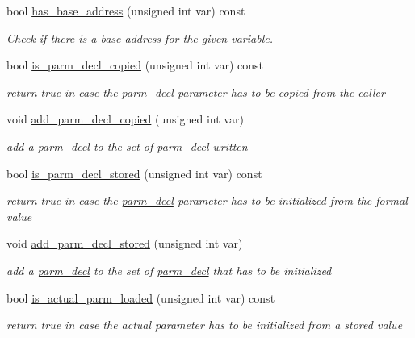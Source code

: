 \begin{DoxyCompactItemize}
bool \hyperlink{classmemory_a96f4c37de951e186df09a2ddc249d77b}{has\+\_\+base\+\_\+address} (unsigned int var) const
\begin{DoxyCompactList}\small\item\em Check if there is a base address for the given variable. \end{DoxyCompactList}\item 
bool \hyperlink{classmemory_ae761b88fcafd4a0c6c7ae4426fe6ceb6}{is\+\_\+parm\+\_\+decl\+\_\+copied} (unsigned int var) const
\begin{DoxyCompactList}\small\item\em return true in case the \hyperlink{structparm__decl}{parm\+\_\+decl} parameter has to be copied from the caller \end{DoxyCompactList}\item 
void \hyperlink{classmemory_aa397acb159d30fa221af9cd66c442d7f}{add\+\_\+parm\+\_\+decl\+\_\+copied} (unsigned int var)
\begin{DoxyCompactList}\small\item\em add a \hyperlink{structparm__decl}{parm\+\_\+decl} to the set of \hyperlink{structparm__decl}{parm\+\_\+decl} written \end{DoxyCompactList}\item 
bool \hyperlink{classmemory_aea74338373012206d2b769a4f1e144c4}{is\+\_\+parm\+\_\+decl\+\_\+stored} (unsigned int var) const
\begin{DoxyCompactList}\small\item\em return true in case the \hyperlink{structparm__decl}{parm\+\_\+decl} parameter has to be initialized from the formal value \end{DoxyCompactList}\item 
void \hyperlink{classmemory_a480a93ec1ca630ee87d15b1ad127f3f2}{add\+\_\+parm\+\_\+decl\+\_\+stored} (unsigned int var)
\begin{DoxyCompactList}\small\item\em add a \hyperlink{structparm__decl}{parm\+\_\+decl} to the set of \hyperlink{structparm__decl}{parm\+\_\+decl} that has to be initialized \end{DoxyCompactList}\item 
bool \hyperlink{classmemory_af12efe6e45e237f9db7bdb650121e3b9}{is\+\_\+actual\+\_\+parm\+\_\+loaded} (unsigned int var) const
\begin{DoxyCompactList}\small\item\em return true in case the actual parameter has to be initialized from a stored value \end{DoxyCompactList}\item 

\end{DoxyCompactItemize}
